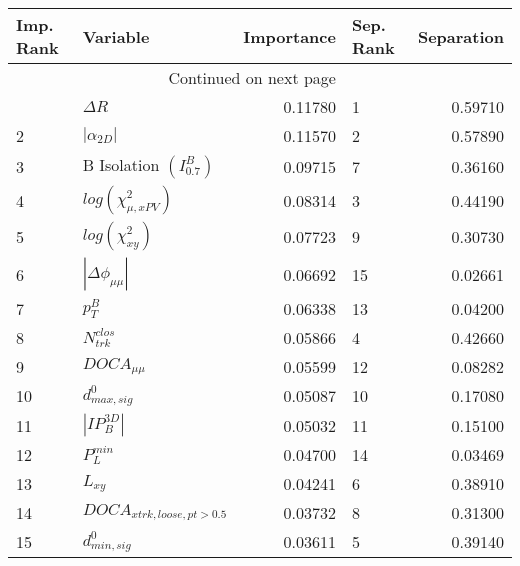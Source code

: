 

\begin{longtable}{llrlr}
\toprule
Imp. Rank &                     Variable &  Importance & Sep. Rank &  Separation \\
\midrule
\endhead
\midrule
\multicolumn{3}{r}{{Continued on next page}} \\
\midrule
\endfoot

\bottomrule
\endlastfoot
        1 &                   $\Delta R$ &     0.11780 &         1 &     0.59710 \\
        2 &              $|\alpha_{2D}|$ &     0.11570 &         2 &     0.57890 \\
        3 &  B Isolation $(I^{B}_{0.7})$ &     0.09715 &         7 &     0.36160 \\
        4 &    $log(\chi^{2}_{\mu,xPV})$ &     0.08314 &         3 &     0.44190 \\
        5 &         $log(\chi^{2}_{xy})$ &     0.07723 &         9 &     0.30730 \\
        6 &     $|\Delta \phi_{\mu\mu}|$ &     0.06692 &        15 &     0.02661 \\
        7 &                    $p^B_{T}$ &     0.06338 &        13 &     0.04200 \\
        8 &             $N^{clos}_{trk}$ &     0.05866 &         4 &     0.42660 \\
        9 &              $DOCA_{\mu\mu}$ &     0.05599 &        12 &     0.08282 \\
       10 &             $d^0_{max, sig}$ &     0.05087 &        10 &     0.17080 \\
       11 &              $|IP_{B}^{3D}|$ &     0.05032 &        11 &     0.15100 \\
       12 &                $P^{min}_{L}$ &     0.04700 &        14 &     0.03469 \\
       13 &                     $L_{xy}$ &     0.04241 &         6 &     0.38910 \\
       14 &   $DOCA_{xtrk,loose,pt>0.5}$ &     0.03732 &         8 &     0.31300 \\
       15 &             $d^0_{min, sig}$ &     0.03611 &         5 &     0.39140 \\
\end{longtable}

